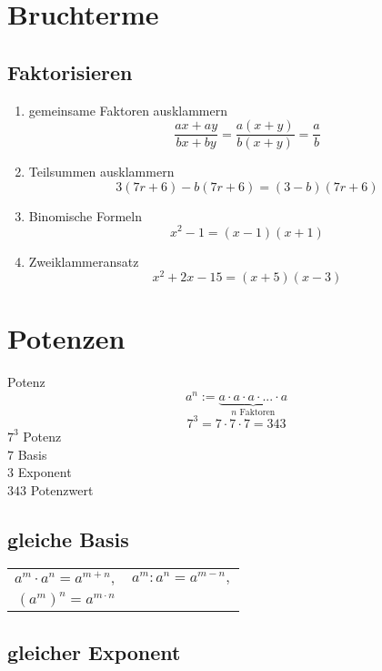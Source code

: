 
\newpage

\begin{multicols}{2}

\section{Bruchterme}
\subsection{Faktorisieren}
\begin{rezept}{}{}
\begin{enumerate}
\item gemeinsame Faktoren ausklammern
$$\frac{ax+ay}{bx+by} =\frac{a(x+y)}{b(x+y)} = \frac{a}b$$
\item Teilsummen ausklammern
$$3(7r+6) - b(7r+6) = (3-b)(7r+6)$$
\item Binomische Formeln
$$x^2-1 = (x-1)(x+1)$$
\item Zweiklammeransatz
$$x^2+2x-15 = (x+5)(x-3)$$
\end{enumerate}
\end{rezept}

\section{Potenzen}
\begin{definition}{Potenz}{}
$$a^n := \underbrace{a\cdot{}a\cdot{}a\cdot{}...\cdot{}a}_{n\textrm{ Faktoren}}$$
$$7^3=7\cdot{}7\cdot{}7=343$$
$7^3$ Potenz\\
$7$ Basis\\
$3$ Exponent\\
$343$ Potenzwert\\
\end{definition}

\subsection{gleiche Basis}
\begin{tabular}{cc}
$a^m\cdot{}a^n = a^{m+n},$ & $a^m:a^n=a^{m-n},$ \\
$\left(a^m\right)^n = a^{m\cdot{}n}$ &\\
 \end{tabular} 

\subsection{gleicher Exponent}


\end{multicols}
